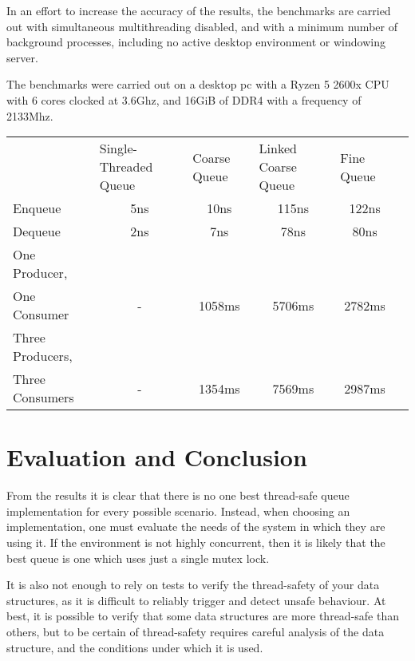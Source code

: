 \documentclass{article}
\begin{document}
In an effort to increase the accuracy of the results, the benchmarks are carried
out with simultaneous multithreading disabled, and with a minimum number of
background processes, including no active desktop environment or windowing
server.

The benchmarks were carried out on a desktop pc with a Ryzen 5 2600x CPU with 6
cores clocked at 3.6Ghz, and 16GiB of DDR4 with a frequency of 2133Mhz.

\begin{table}[h]
\centering
\begin{tabular}{lccccl}
                                 & \multicolumn{1}{l}{Single-Threaded Queue} & \multicolumn{1}{l}{Coarse Queue} & \multicolumn{1}{l}{Linked Coarse Queue} & \multicolumn{1}{l}{Fine Queue} &   \\
Enqueue                          & 5ns                                       & 10ns                             & 115ns                                   & 122ns                          &   \\
Dequeue                          & 2ns                                       & 7ns                              & 78ns                                    & 80ns                           &   \\
One Producer,\\ One Consumer       & -                                         & 1058ms                           & 5706ms                                  & 2782ms                         &   \\
Three Producers,\\ Three Consumers & -                                         & 1354ms                           & 7569ms                                  & 2987ms                         &  
\end{tabular}
\end{table}

\section{Evaluation and Conclusion}
From the results it is clear that there is no one best thread-safe queue
implementation for every possible scenario. Instead, when choosing an
implementation, one must evaluate the needs of the system in which they are
using it. If the environment is not highly concurrent, then it is likely that
the best queue is one which uses just a single mutex lock.  

It is also not enough to rely on tests to verify the thread-safety of your
data structures, as it is difficult to reliably trigger and detect unsafe
behaviour. At best, it is possible to verify that some data structures are more
thread-safe than others, but to be certain of thread-safety requires careful
analysis of the data structure, and the conditions under which it is used.

\nocite{*}

\end{document}
